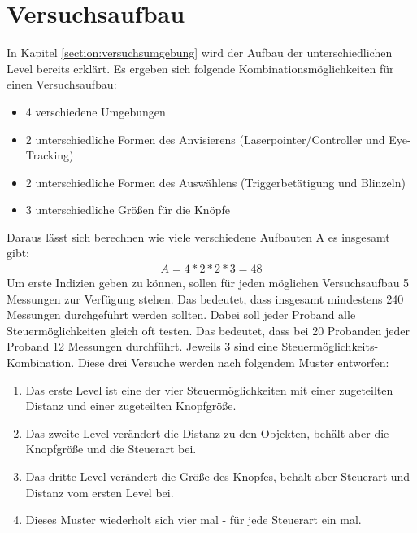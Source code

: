 \section{Versuchsaufbau} 
In Kapitel \ref{section:versuchsumgebung} wird der Aufbau der unterschiedlichen Level bereits erklärt. Es ergeben sich folgende Kombinationsmöglichkeiten für einen Versuchsaufbau:
\begin{itemize}
	\item 4 verschiedene Umgebungen
	\item 2 unterschiedliche Formen des Anvisierens (Laserpointer/Controller und Eye-Tracking)
	\item 2 unterschiedliche Formen des Auswählens (Triggerbetätigung und Blinzeln)
	\item 3 unterschiedliche Größen für die Knöpfe
\end{itemize}
Daraus lässt sich berechnen wie viele verschiedene Aufbauten A es insgesamt gibt:
\begin{align}
	A=4*2*2*3=48
\end{align}
Um erste Indizien geben zu können, sollen für jeden möglichen Versuchsaufbau 5 Messungen zur Verfügung stehen. Das bedeutet, dass insgesamt mindestens 240 Messungen durchgeführt werden sollten. Dabei soll jeder Proband alle Steuermöglichkeiten gleich oft testen. Das bedeutet, dass bei 20 Probanden jeder Proband 12 Messungen durchführt. Jeweils 3 sind eine Steuermöglichkeits-Kombination. Diese drei Versuche werden nach folgendem Muster entworfen:
\begin{enumerate}
	\item Das erste Level ist eine der vier Steuermöglichkeiten mit einer zugeteilten Distanz und einer zugeteilten Knopfgröße.
	\item Das zweite Level verändert die Distanz zu den Objekten, behält aber die Knopfgröße und die Steuerart bei.
	\item Das dritte Level verändert die Größe des Knopfes, behält aber Steuerart und Distanz vom ersten Level bei.
	\item Dieses Muster wiederholt sich vier mal - für jede Steuerart ein mal.
\end{enumerate}

